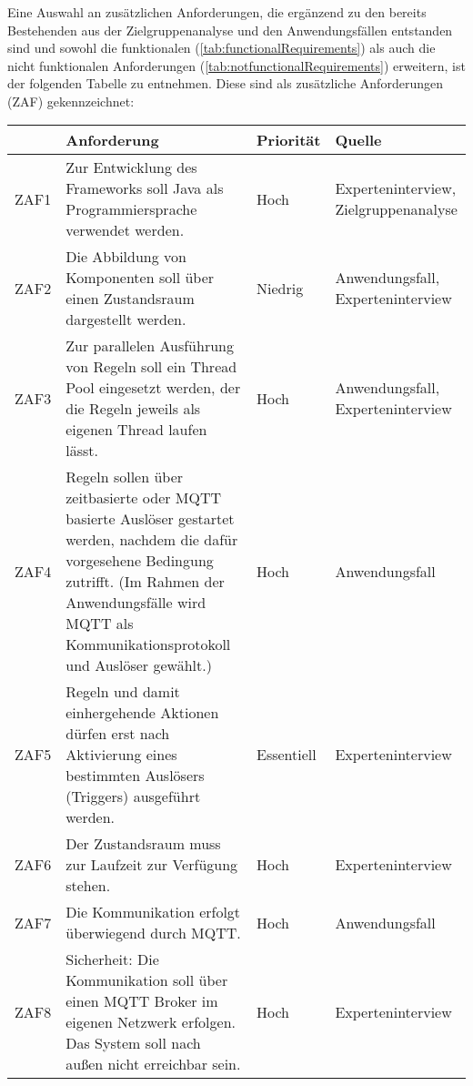 \subsubsection*{}
Eine Auswahl an zusätzlichen Anforderungen, die ergänzend zu den bereits Bestehenden aus der Zielgruppenanalyse und den Anwendungsfällen entstanden sind und sowohl die funktionalen 
(\ref{tab:functionalRequirements}) als auch die nicht funktionalen Anforderungen (\ref{tab:notfunctionalRequirements}) erweitern, ist der folgenden 
Tabelle zu entnehmen. Diese sind als zusätzliche Anforderungen (ZAF) gekennzeichnet: 
\begin{table}[hbt!]
    \begin{center}
        \begin{tabular}{ | p{1.0cm} | p{9.2cm} | p{1.6cm} | p{3.1cm} | }
            \hline
                \textbf{} & \textbf{Anforderung} & \textbf{Priorität} & \textbf{Quelle} \\
            \hline
                ZAF1 & Zur Entwicklung des Frameworks soll Java als Programmiersprache verwendet werden. & Hoch & Experteninterview, Zielgruppenanalyse \\ 
            \hline
                ZAF2 & Die Abbildung von Komponenten soll über einen Zustandsraum dargestellt werden. & Niedrig & Anwendungsfall, Experteninterview \\ 
            \hline
                ZAF3 & Zur parallelen Ausführung von Regeln soll ein Thread Pool eingesetzt werden, der die Regeln jeweils als eigenen Thread laufen lässt. & Hoch & Anwendungsfall, Experteninterview \\ 
            \hline
                ZAF4 & Regeln sollen über zeitbasierte oder MQTT basierte Auslöser gestartet werden, nachdem die dafür vorgesehene Bedingung zutrifft. (Im Rahmen der Anwendungsfälle wird MQTT als Kommunikationsprotokoll und Auslöser gewählt.) & Hoch & Anwendungsfall \\
            \hline
                ZAF5 & Regeln und damit einhergehende Aktionen dürfen erst nach Aktivierung eines bestimmten Auslösers (Triggers) ausgeführt werden. & Essentiell & Experteninterview \\
            \hline
                ZAF6 & Der Zustandsraum muss zur Laufzeit zur Verfügung stehen. & Hoch & Experteninterview \\ 
            \hline
                ZAF7 & Die Kommunikation erfolgt überwiegend durch MQTT. & Hoch & Anwendungsfall \\ 
            \hline
                ZAF8 & Sicherheit: Die Kommunikation soll über einen MQTT Broker im eigenen Netzwerk erfolgen. Das System soll nach außen nicht erreichbar sein. & Hoch & Experteninterview \\

\end{tabular}
\end{center}
\end{table}
